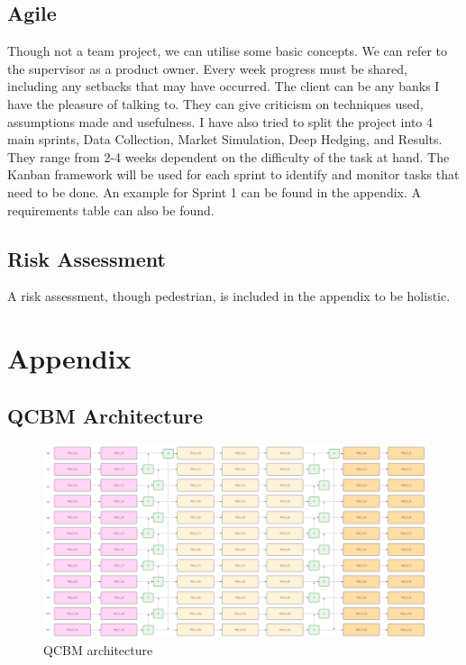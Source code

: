 \documentclass[12pt]{article}
\numberwithin{equation}{section}
\begin{document}
\subsection{Agile}
Though not a team project, we can utilise some basic concepts. We can refer to 
the supervisor as a product owner. Every week progress must be shared, including 
any setbacks that may have occurred. The client can be any banks I have the 
pleasure of talking to. They can give criticism on techniques used, assumptions 
made and usefulness. I have also tried to split the project into 4 main sprints,
Data Collection, Market Simulation, Deep Hedging, and Results. They range from 
2-4 weeks dependent on the difficulty of the task at hand. The Kanban framework 
will be used for each sprint to identify and monitor tasks that need to be done. 
An example for Sprint 1 can be found in the appendix. A requirements table can 
also be found.


\subsection{Risk Assessment}
A risk assessment, though pedestrian, is included in the appendix to be holistic.\\
\clearpage


\printbibliography

\clearpage
\section{Appendix}
\subsection{QCBM Architecture}

\begin{figure}[h]
    \centering
    \includegraphics[scale=0.3, angle=270, width=\textwidth-209]{qcbm1.png}
    \caption{QCBM architecture}
\end{figure}
\clearpage
\end{document}
